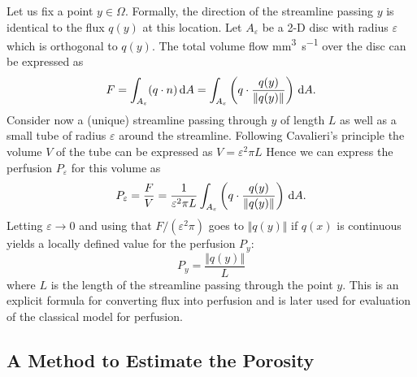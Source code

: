 \documentclass[paper=a4, fontsize=11pt,parskip=half,headings=small]{scrartcl}
\newcommand{\siqt}{\cubic\milli\meter\per\second}
\begin{document}
	Let us fix a point $y \in \Omega$.
	Formally, the direction of the streamline passing $y$ is identical to the flux $q(y)$ at this location. 
	Let $A_\varepsilon$ be a 2-D disc with radius $\varepsilon$ which is orthogonal to $q(y)$.
	The total volume flow \si{\siqt} over the disc can be expressed as
	\[
		F = \int_{A_\varepsilon} (q \cdot n) \,\mathrm{d} A = \int_{A_\varepsilon} \left(q\cdot \frac{q(y)}{\Vert q(y) \Vert}\right) \,\mathrm{d} A.
	\]
	Consider now a (unique) streamline passing through $y$ of length $L$ as well as a small tube of radius $\varepsilon$ around the streamline.
	Following Cavalieri's principle the volume $V$ of the tube can be expressed as $V = \varepsilon^2\pi L$
	Hence we can express the perfusion $P_\varepsilon$ for this volume as
	\[
		P_\varepsilon = \frac{F}{V} = \frac{1}{\varepsilon^2 \pi L} \int_{A_\varepsilon} \left( q\cdot \frac{q(y)}{\Vert q(y) \Vert} \right) \,\mathrm{d} A. 
	\]
	Letting $\varepsilon \to 0$ and using that $F/(\varepsilon^2\pi)$ goes to $\Vert q(y) \Vert$ if $q(x)$ is continuous yields a locally defined value for the perfusion $P_{y}$:
	\begin{equation}
		P_{y} = \frac{\Vert q(y) \Vert}{L}
		\label{eq:flux2perf}
	\end{equation}
	where $L$ is the length of the streamline passing through the point $y$. 
	This is an explicit formula for converting flux into perfusion and is later used for evaluation of the classical model for perfusion. 
	
	
	


	\subsection{A Method to Estimate the Porosity}\label{sec:CBV}
	
\end{document}
